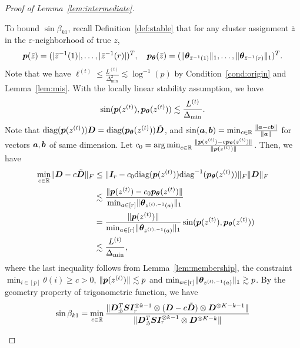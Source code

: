 \documentclass[lettersize,onecolumn,journal]{IEEEtran}
\theoremstyle{definition}
\theoremstyle{definition}
\begin{document}
\begin{proof}[Proof of Lemma~\ref{lem:intermediate}]
\begin{enumerate}[wide]
    To bound $\sin \beta_{k1}$, recall Definition~\ref{def:stable} that for any cluster assignment $\bar z$ in the $\varepsilon$-neighborhood of true $z$,
    \begin{equation}
        \bm{p}(\bar z)=(|\bar z^{-1}(1)|, \ldots,|\bar z^{-1}(r)|)^T,\quad \bm{p}_{\boldsymbol{\theta}}(\bar z)=(\lVert\boldsymbol{\theta}_{\bar z^{-1}(1)}\rVert_1,\ldots,\lVert\boldsymbol{\theta}_{\bar z^{-1}(r)}\rVert_1)^T.
    \end{equation}
    Note that we have $\ell^{(t)} \leq \frac{L^{(t)}}{\Delta_{\min}^2} \lesssim \log^{-1}(p) $ by Condition~\ref{cond:origin} and Lemma~\ref{lem:mis}. With the locally linear stability assumption, we have 
    \begin{equation}
         \sin (\bm{p}(z^{(t)}), \bm{p}_{\boldsymbol{\theta}}(z^{(t)})) \lesssim \frac{L^{(t)}}{\Delta_{\min}}. 
    \end{equation}
    Note that $\text{diag}(\bm{p}(z^{(t)})) \bm{D} = \text{diag}(\bm{p}_{\boldsymbol{\theta}}(z^{(t)})) \tilde {\bm{D}}$, and $\sin(\bm{a},\bm{b}) =\min_{c \in \mathbb{R}} \frac{ \lVert\bm{a} - c\bm{b}\rVert }{\lVert\bm{a}\rVert}$ for vectors $\bm{a},\bm{b}$ of same dimension. Let $c_0 = \operatorname*{arg\,min}_{c \in \mathbb{R}} \frac{\lVert\bm{p}(z^{(t)}) - c\bm{p}_{\boldsymbol{\theta}}(z^{(t)})\rVert}{\lVert\bm{p}(z^{(t)})\rVert}$. Then, we have
    \begin{align}
       \min_{c \in \mathbb{R}} \lVert \bm{D} - c \tilde {\bm{D}}\rVert_F &\leq  \lVert \bm I_r - c_0 \text{diag}(\bm{p}(z^{(t)})) \text{diag}^{-1}(\bm{p}_{\boldsymbol{\theta}}(z^{(t)}))\rVert_F \lVert\bm{D}\rVert_F\\
       &\lesssim \frac{ \lVert \bm{p}(z^{(t)}) - c_0\bm{p}_{\boldsymbol{\theta}}(z^{(t)})\rVert }{\min_{a \in [r]} \lVert\boldsymbol{\theta}_{z^{(t),-1}(a)} \rVert_1  } \\
       & = \frac{\lVert \bm{p}(z^{(t)})\rVert }{\min_{a \in [r]} \lVert\boldsymbol{\theta}_{z^{(t),-1}(a)} \rVert_1 } \sin (\bm{p}(z^{(t)}), \bm{p}_{\boldsymbol{\theta}}(z^{(t)}))\\
       & \lesssim \frac{L^{(t)}}{\Delta_{\min}},
    \end{align}
    where the last inequality follows from Lemma~\ref{lem:membership}, the constraint $\min_{i \in [p]}\theta(i) \geq c>0$, $\lVert \bm{p}(z^{(t)})\rVert \lesssim p$ and $\min_{a \in [r]} \lVert\boldsymbol{\theta}_{z^{(t),-1}(a)} \rVert_1  \gtrsim p$. By the geometry property of trigonometric function, we have
    \begin{align}\label{eq:b1}
        \sin \beta_{k1} &= \min_{c \in \bbR} \frac{\onormSize{}{\mD_{:b}^{T} \mS \mI_r^{\otimes k-1} \otimes (\mD - c \tilde \mD) \otimes \mD^{\otimes K-k - 1} } }{ \onormSize{}{\mD_{:b}^{T} \mS \mI_r^{\otimes k-1} \otimes \mD^{\otimes K-k}} }\\

\end{align}
\end{enumerate}
\end{proof}
\end{document}
